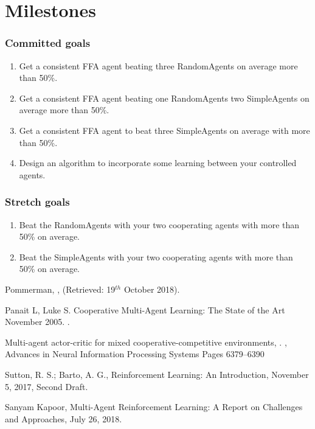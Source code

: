 \section{Milestones}
\subsubsection{Committed goals}
\begin{enumerate}
    \item Get a consistent FFA agent beating three RandomAgents on average more than 50\%.
    \item Get a consistent FFA agent beating one RandomAgents two SimpleAgents on average more than 50\%.
    \item Get a consistent FFA agent to beat three SimpleAgents on average with more than 50\%.
    \item Design an algorithm to incorporate some learning between your controlled agents.
\end{enumerate}

\subsubsection{Stretch goals}
\begin{enumerate}
    \item Beat the RandomAgents with your two cooperating agents with more than 50\% on average.
    \item Beat the SimpleAgents with your two cooperating agents with more than 50\% on average.
\end{enumerate}

\begin{thebibliography}{9}

    \newblock Pommerman,
    ,
    \newblock (Retrieved: 19$^{th}$ October 2018).

    \newblock Panait L, Luke S. Cooperative Multi-Agent Learning: The State of the Art
    \newblock November 2005.
    .

	\newblock Multi-agent actor-critic for mixed cooperative-competitive environments,
    .
    ,
    \newblock Advances in Neural Information Processing Systems
    \newblock Pages 6379--6390

    \newblock Sutton, R. S.; Barto, A. G., 
    \newblock Reinforcement Learning: An Introduction, November 5, 2017, Second Draft.

    \newblock Sanyam Kapoor, 
    \newblock Multi-Agent Reinforcement Learning: A Report on Challenges and Approaches, July 26, 2018.
    
\end{thebibliography}